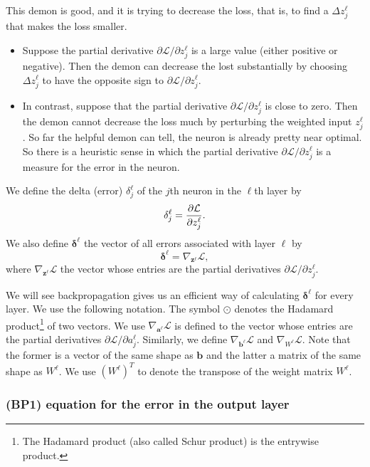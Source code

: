 \documentclass[12pt]{article}
\renewcommand{\a}{\boldsymbol{a}}
\renewcommand{\b}{\boldsymbol{b}}
\newcommand{\z}{\boldsymbol{z}}
\newcommand{\bdelta}{\boldsymbol{\delta}}
\newcommand{\cL}{\mathcal{L}}
\begin{document}
This demon is good, and it is trying to decrease the loss, that is, to find a $\Delta z^\ell_j$ that makes the loss smaller. 
\begin{itemize}
\item Suppose the partial derivative ${\partial \cL / \partial z^\ell_j}$ is a large value (either positive or negative). Then the demon can decrease the lost substantially by choosing $\Delta z_j^\ell$ to have the opposite sign to ${\partial \cL / \partial z^\ell_j}$.
\item In contrast, suppose that the partial derivative ${\partial \cL / \partial z^\ell_j}$ is close to zero. Then the demon cannot decrease the loss much by perturbing the weighted input $z^\ell_j$. So far the helpful demon can tell, the neuron is already pretty near optimal. So there is a heuristic sense in which the partial derivative ${\partial \cL / \partial z^\ell_j}$ is a measure for the error in the neuron.
\end{itemize}

We define the delta (error) $\delta^\ell_j$ of the $j$th neuron in the $\ell$th layer by
\begin{equation}
\delta^\ell_j = {\partial \cL \over \partial z^\ell_j}.
\end{equation}
We also define $\bdelta^\ell$ the vector of all errors associated with layer $\ell$ by
\begin{equation}
\bdelta^\ell = \nabla_{\z^\ell} \cL,
\end{equation}
where $\nabla_{\z^\ell} \cL$ the vector whose entries are the partial derivatives $\partial \cL / \partial z^\ell_j$.

We will see backpropagation gives us an efficient way of calculating $\bdelta^\ell$ for every layer. We use the following notation. The symbol $\odot$ denotes the Hadamard product\footnote{The Hadamard product (also called Schur product) is the entrywise product.} of two vectors. We use $\nabla_{\a^\ell} \cL$ is defined to the vector whose entries are the partial derivatives $\partial \cL / \partial a^\ell_j$. Similarly, we define $\nabla_{\b^\ell} \cL$ and $\nabla_{W^\ell} \cL$. Note that the former is a vector of the same shape as $\b$ and the latter a matrix of the same shape as $W^\ell$. We use $(W^\ell)^T$ to denote the transpose of the weight matrix $W^\ell$.

\subsubsection*{(BP1) equation for the error in the output layer}
\end{document}
